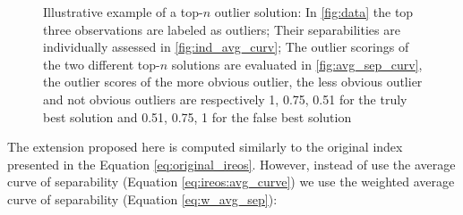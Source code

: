 \begin{figure}[h!]
\center
{}
\qquad
{}
\qquad
{}
\caption{Illustrative example of a top-$n$ outlier solution: In \ref{fig:data} the top three observations are labeled as outliers; Their separabilities are individually assessed in \ref{fig:ind_avg_curv}; The outlier scorings of the two different top-$n$ solutions are evaluated in \ref{fig:avg_sep_curv}, the outlier scores of the more obvious outlier, the less obvious outlier and not obvious outliers are respectively 1, 0.75, 0.51 for the truly best solution and 0.51, 0.75, 1 for the false best solution}
\label{fig:ilustration}
\end{figure}

The extension proposed here is computed similarly to the original index presented in the Equation \ref{eq:original_ireos}. However, instead of use the average curve of separability (Equation \ref{eq:ireos:avg_curve}) we use the weighted average curve of separability (Equation \ref{eq:w_avg_sep}):

